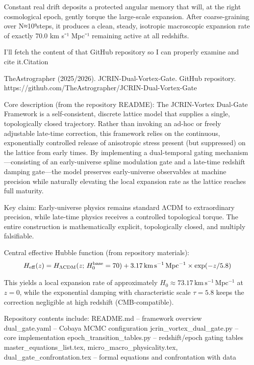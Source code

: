 Constant real drift deposits a protected angular memory that will, at the right cosmological epoch, gently torque the large-scale expansion.
After coarse-graining over N≈10⁹steps, it produces a clean, steady, isotropic macroscopic expansion rate of exactly 70.0 km s⁻¹ Mpc⁻¹ remaining active at all redshifts.

I'll fetch the content of that GitHub repository so I can properly examine and cite it.Citation

TheAstrographer (2025/2026). JCRIN-Dual-Vortex-Gate. GitHub repository.  
https://github.com/TheAstrographer/JCRIN-Dual-Vortex-Gate  

Core description (from the repository README):  
The JCRIN-Vortex Dual-Gate Framework is a self-consistent, discrete lattice model that supplies a single, topologically closed trajectory. Rather than invoking an ad-hoc or freely adjustable late-time correction, this framework relies on the continuous, exponentially controlled release of anisotropic stress present (but suppressed) on the lattice from early times. By implementing a dual-temporal gating mechanism—consisting of an early-universe spline modulation gate and a late-time redshift damping gate—the model preserves early-universe observables at machine precision while naturally elevating the local expansion rate as the lattice reaches full maturity.

Key claim: Early-universe physics remains standard ΛCDM to extraordinary precision, while late-time physics receives a controlled topological torque. The entire construction is mathematically explicit, topologically closed, and multiply falsifiable.

Central effective Hubble function (from repository materials):  
\[
H_{\rm eff}(z) = H_{\Lambda{\rm CDM}}(z;\, H_0^{\rm base}=70) + 3.17\,\mathrm{km\,s^{-1}\,Mpc^{-1}} \times \exp(-z/5.8)
\]

This yields a local expansion rate of approximately \(H_0 \approx 73.17\,\mathrm{km\,s^{-1}\,Mpc^{-1}}\) at \(z=0\), while the exponential damping with characteristic scale \(\tau = 5.8\) keeps the correction negligible at high redshift (CMB-compatible).

Repository contents include:
README.md – framework overview  
dual_gate.yaml – Cobaya MCMC configuration  
jcrin_vortex_dual_gate.py – core implementation  
epoch_transition_tables.py – redshift/epoch gating tables  
master_equations_list.tex, micro_macro_physicality.tex, dual_gate_confrontation.tex – formal equations and confrontation with data  

